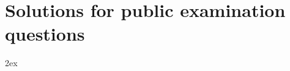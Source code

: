 \chapter{Solutions for public examination questions}

\begingroup
\parindent 0pt
\parskip 2ex
\def\enotesize{\normalsize}
\def\makeenmark{\relax}
\def\notesname{Solutions}
\theendnotes
\endgroup



